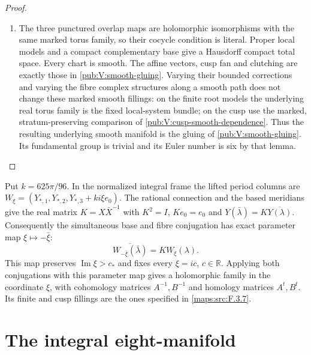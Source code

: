 \begin{proof}
\begin{enumerate}[label={$\langle1\rangle$\arabic*.}]
The local filling theorem \cref{night:P1.9} applies to this bounded
holomorphic correction. It gives smoothness, proper discontinuity
and properness in the prescribed marking. We glue with zero cusp
translation.

\item The three punctured overlap maps are holomorphic isomorphisms
with the same marked torus family, so their cocycle condition
is literal.  Proper local models and a compact complementary
base give a Hausdorff compact total space.  Every chart is
smooth.  The affine vectors, cusp fan and clutching are exactly
those in \cref{pub:V:smooth-gluing}.  Varying their bounded corrections
and varying the fibre complex structures along a smooth path
does not change these marked smooth fillings: on the finite
root models the underlying real torus family is the fixed
local-system bundle; on the cusp use the marked, stratum-preserving comparison of
\cref{pub:V:cusp-smooth-dependence}.  Thus the resulting underlying smooth manifold
is the gluing of \cref{pub:V:smooth-gluing}. Its fundamental group is trivial and its Euler number is six by that lemma.

\end{enumerate}
\end{proof}

\begin{remark}
\hypertarget{tag-PV05}{}\label{rem:V:conjugation-parameter}
Put $k=625\pi/96$. In the normalized integral frame the lifted
period columns are
$W_\xi=(Y_{*,1},Y_{*,2},Y_{*,3}+ki\xi e_0)$.
The rational connection and the based meridians give the real
matrix $K=X\bar X^{-1}$ with
$K^2=I$, $Ke_0=e_0$ and
$Y(\bar\lambda)=K\overline{Y(\lambda)}$.
Consequently the simultaneous base and fibre conjugation has
exact parameter map $\xi\mapsto-\bar\xi$:
\[
 \overline{W_{-\bar\xi}(\bar\lambda)}=K W_\xi(\lambda).
\]
This map preserves $\operatorname{Im}\xi>c_*$ and fixes every
$\xi=ic$, $c\in\mathbb R$. Applying both conjugations with this
parameter map gives a holomorphic family in the coordinate
$\xi$, with cohomology matrices $A^{-1},B^{-1}$ and homology
matrices $A^t,B^t$. Its finite and cusp fillings are the ones
specified in \cref{maps:src:F.3.7}.
\end{remark}




\section{The integral eight-manifold}






